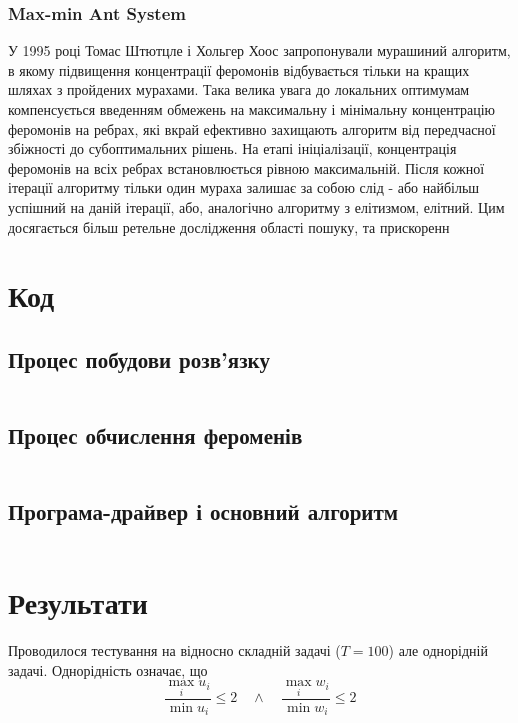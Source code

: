 \documentclass[a4paper, 12pt]{article}
\numberwithin{equation}{section}
\begin{document}
\subsubsection{Max-min Ant System}

У 1995 році Томас Штютцле і Хольгер Хоос запропонували мурашиний алгоритм, в якому підвищення концентрації феромонів відбувається тільки на кращих шляхах з пройдених мурахами. Така велика увага до локальних оптимумам компенсується введенням обмежень на максимальну і мінімальну концентрацію феромонів на ребрах, які вкрай ефективно захищають алгоритм від передчасної збіжності до субоптимальних рішень.
На етапі ініціалізації, концентрація феромонів на всіх ребрах встановлюється рівною максимальній. Після кожної ітерації алгоритму тільки один мураха залишає за собою слід - або найбільш успішний на даній ітерації, або, аналогічно алгоритму з елітизмом, елітний. Цим досягається більш ретельне дослідження області пошуку, та  прискоренн

\section{Код}

\subsection{Процес побудови розв'язку}
\inputminted{python}{../../code/knapsack/generate_solution.py}

\subsection{Процес обчислення фероменів}

\inputminted{python}{../../code/knapsack/calculate_feroments.py}

\subsection{Програма-драйвер і основний алгоритм}

\inputminted{python}{../../code/knapsack/main.py}

\section{Результати}

Проводилося тестування на відносно складній задачі ($T = 100$) але однорідній задачі. Однорідність означає, що
\begin{equation}
    \frac{\max_i u_i}{\min u_i} \le 2 \quad \land \quad \frac{\max_i w_i}{\min w_i} \le 2
\end{equation}
\end{document}
